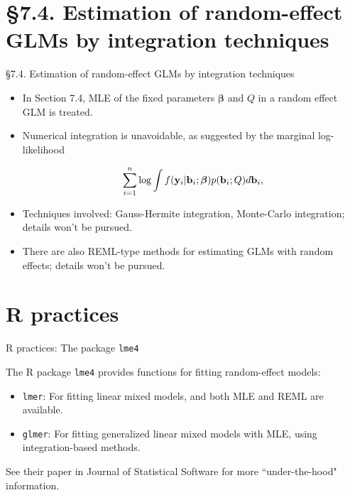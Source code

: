 \documentclass{beamer}
\newcommand{\currentsection}{}
\let\oldsection\section
\renewcommand{\section}[1]{\oldsection{#1}\renewcommand{\currentsection}{#1}}
\begin{document}
\section{\S7.4. Estimation of random-effect GLMs by integration techniques}\label{sec:7.4}
\begin{frame}{\S7.4. Estimation of random-effect GLMs by integration techniques}
\begin{itemize}


\item In Section 7.4, MLE  of the fixed parameters $\boldsymbol \beta$ and $Q$ in a random effect GLM is treated.


\item  Numerical integration is unavoidable, as suggested by the marginal log-likelihood

\[
\sum_{i =1}^n \log \int f({\bf y}_i | {\bf b}_i ; {\boldsymbol \beta}) p({\bf b}_i ;Q) d{\bf b}_i,
\]


\item   Techniques involved: Gauss-Hermite integration, Monte-Carlo integration; details won't be pursued.

\item There are also REML-type methods for estimating GLMs with random effects; details won't be pursued.

%


\end{itemize}
\end{frame}




\section{R practices}\label{sec:7.5}

\begin{frame} {R practices: The package \texttt{lme4}}

The R package \texttt{lme4} provides functions for fitting  random-effect models:

\begin{itemize}

\item \texttt{lmer}: For fitting linear mixed models, and both MLE and REML are available. 

\item \texttt{glmer}: For fitting generalized linear mixed models with MLE, using integration-based methods. 






\end{itemize}
See their paper in Journal of Statistical Software \cite{lme4paper} for more ``under-the-hood" information. 

\end{frame}
\end{document}
